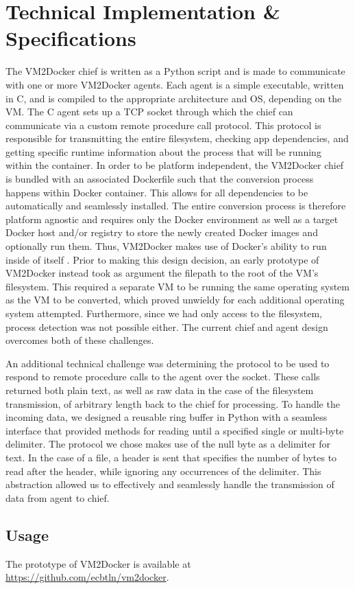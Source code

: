 \section{Technical Implementation \& Specifications}
\label{sec:techspecs}
The VM2Docker chief is written as a Python script and is made to communicate with one or more VM2Docker agents. Each agent is a simple executable, written in C, and is compiled to the appropriate architecture and OS, depending on the VM. The C agent sets up a TCP socket through which the chief can communicate via a custom remote procedure call protocol. This protocol is responsible for transmitting the entire filesystem, checking app dependencies, and getting specific runtime information about the process that will be running within the container. In order to be platform independent, the VM2Docker chief is bundled with an associated Dockerfile such that the conversion process happens within Docker container. This allows for all dependencies to be automatically and seamlessly installed. The entire conversion process is therefore platform agnostic and requires only the Docker environment as well as a target Docker host and/or registry to store the newly created Docker images and optionally run them. Thus, VM2Docker makes use of Docker's ability to run inside of itself \cite{dockerindocker}. Prior to making this design decision, an early prototype of VM2Docker instead took as argument the filepath to the root of the VM's filesystem. This required a separate VM to be running the same operating system as the VM to be converted, which proved unwieldy for each additional operating system attempted. Furthermore, since we had only access to the filesystem, process detection was not possible either. The current chief and agent design overcomes both of these challenges. 

An additional technical challenge was determining the protocol to be used to respond to remote procedure calls to the agent over the socket. These calls returned both plain text, as well as raw data in the case of the filesystem transmission, of arbitrary length back to the chief for processing. To handle the incoming data, we designed a reusable ring buffer in Python with a seamless interface that provided methods for reading until a specified single or multi-byte delimiter. The protocol we chose makes use of the null byte as a delimiter for text. In the case of a file, a header is sent that specifies the number of bytes to read after the header, while ignoring any occurrences of the delimiter. This abstraction allowed us to effectively and seamlessly handle the transmission of data from agent to chief.

\subsection{Usage}



The prototype of VM2Docker is available at \url{https://github.com/ecbtln/vm2docker}.
